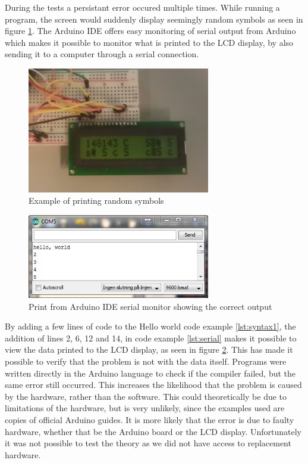 During the tests a persistant error occured multiple times. While running a program, the screen would suddenly display seemingly random symbols as seen in figure \ref{fig:symbolerror}. The Arduino IDE offers easy monitoring of serial output from Arduino which makes it possible to monitor what is printed to the LCD display, by also sending it to a computer through a serial connection.
\begin{figure}[h]
\centering
\includegraphics[width=8cm]{billeder/test_giberish.jpg}
\caption{Example of printing random symbols}
\label{fig:symbolerror}
\end{figure}

\begin{figure}[hbtp]
\centering
\includegraphics[width=8cm]{billeder/arduino_serial_output.JPG}
\caption{Print from Arduino IDE serial monitor showing the correct output}
\label{fig:serial}
\end{figure}

By adding a few lines of code to the Hello world code example \ref{lst:syntax1}, the addition of lines 2, 6, 12 and 14, in code example \ref{lst:serial} makes it possible to view the data printed to the LCD display, as seen in figure \ref{fig:serial}. This has made it possible to verify that the problem is not with the data itself. Programs were written directly in the Arduino language to check if the compiler failed, but the same error still occurred. This increases the likelihood that the problem is caused by the hardware, rather than the software. This could theoretically be due to limitations of the hardware, but is very unlikely, since the examples used are copies of official Arduino guides. It is more likely that the error is due to faulty hardware, whether that be the Arduino board or the LCD display. Unfortunately it was not possible to test the theory as we did not have access to replacement hardware.

